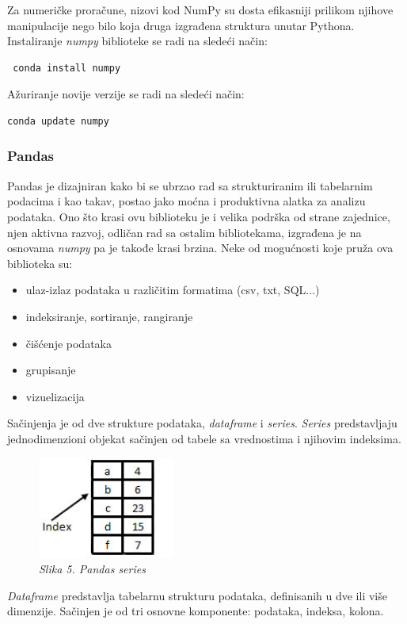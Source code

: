 \documentclass[12pt]{article}
\begin{document}
Za numeričke proračune, nizovi kod NumPy su dosta efikasniji prilikom njihove manipulacije nego bilo koja druga izgrađena struktura unutar Pythona. Instaliranje \textsl{numpy} biblioteke se radi na sledeći način:
\begin{lstlisting}
 conda install numpy
\end{lstlisting}
 Ažuriranje novije verzije se radi na sledeći način:
\begin{lstlisting}[language=Python]
 conda update numpy
\end{lstlisting}
\subsubsection{Pandas}
Pandas je dizajniran kako bi se ubrzao rad sa strukturiranim ili tabelarnim podacima i kao takav, postao jako moćna i produktivna alatka za analizu podataka. Ono što krasi ovu biblioteku je i velika podrška od strane zajednice, njen aktivna razvoj, odličan rad sa ostalim bibliotekama, izgrađena je na osnovama \textsl{numpy} pa je takođe krasi brzina. Neke od mogućnosti koje pruža ova biblioteka su:
\begin{itemize}
  \item ulaz-izlaz podataka u različitim formatima (csv, txt, SQL...)
  \item indeksiranje, sortiranje, rangiranje
  \item čišćenje podataka 
  \item grupisanje
  \item vizuelizacija
\end{itemize}
Sačinjenja je od dve strukture podataka, \textsl{dataframe} i \textsl{series}.  \textsl{Series} predstavljaju jednodimenzioni objekat sačinjen od tabele sa vrednostima i njihovim indeksima. 
\begin{figure}[h!]
\centering
\includegraphics[width=0.4\textwidth]{pandas-series.jpg}
\caption*{\textsl{Slika 5. Pandas series }}
\end{figure}
\textsl{Dataframe} predstavlja tabelarnu strukturu podataka, definisanih u dve ili više dimenzije.  Sačinjen je od tri osnovne komponente: podataka, indeksa, kolona. 
\end{document}
